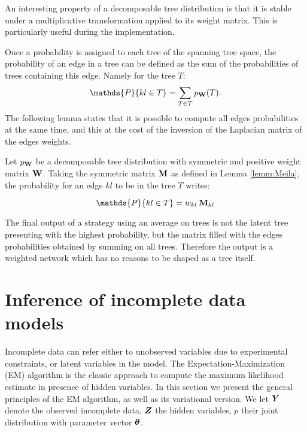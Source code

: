 An interesting property of a decomposable tree distribution is that it is stable under a multiplicative transformation applied to its weight matrix. This is particularly useful during the implementation.

Once a probability is assigned to each tree of the spanning tree space, the probability of an edge in a tree can be defined as the sum of the probabilities of trees containing this edge. Namely for the tree $T$:
$$\mathds{P}\{kl\in T\} = \sum_{T\in \mathcal{T}} p_{\Wbf}(T).$$
The following lemma  states that it is possible to compute all edges probabilities at the same time, and this at the cost of the inversion of the  Laplacian matrix of the edges weights.

\begin{lemma}  \label{lem:Kirshner}
    Let $p_{{\bf W}}$ be a decomposable tree distribution with symmetric and positive weight matrix ${\bf W}$. Taking the symmetric matrix ${\bf M}$ as defined in Lemma  \ref{lemm:Meila}, the probability for an edge $kl$ to be in the tree $T$ writes:
 
$$\mathds{P}\{kl\in T\} =  w_{kl}\: \Mbf_{kl}$$
\end{lemma}

The final output of a strategy using an average on trees is not the latent tree presenting with the highest probability, but the matrix filled with the edges probabilities obtained by summing on all trees. Therefore the output is a weighted network which has no reasons to be shaped as a tree itself.

\section{Inference of incomplete data models}
Incomplete data can refer either to unobserved variables due to experimental constraints, or latent variables in the model. The Expectation-Maximization (EM) algorithm \citep{DLR77} is the classic approach to compute the maximum likelihood estimate in presence of hidden variables. In this section we present the general principles of the EM algorithm, as well as its variational version. We let ${\boldsymbol{Y}}$ denote the observed incomplete data, ${\boldsymbol{Z}}$ the hidden variables, $p$ their joint distribution with parameter vector ${\boldsymbol{\theta}}$.
 

